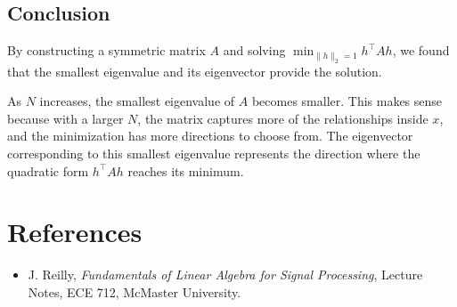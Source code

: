 \documentclass[12pt,a4paper]{article}
\begin{document}
\subsection{Conclusion}
By constructing a symmetric matrix $A$ and solving $\min_{\|h\|_2=1} h^\top A h$,  
we found that the smallest eigenvalue and its eigenvector provide the solution.  


As $N$ increases, the smallest eigenvalue of $A$ becomes smaller.  
This makes sense because with a larger $N$, the matrix captures more of the relationships inside $x$, and the minimization has more directions to choose from.  
The eigenvector corresponding to this smallest eigenvalue represents the direction where the quadratic form $h^\top A h$ reaches its minimum.
\newpage
\section*{References}
\begin{itemize}
    \item J. Reilly, \textit{Fundamentals of Linear Algebra for Signal Processing}, Lecture Notes, ECE 712, McMaster University.
\end{itemize}
\end{document}
